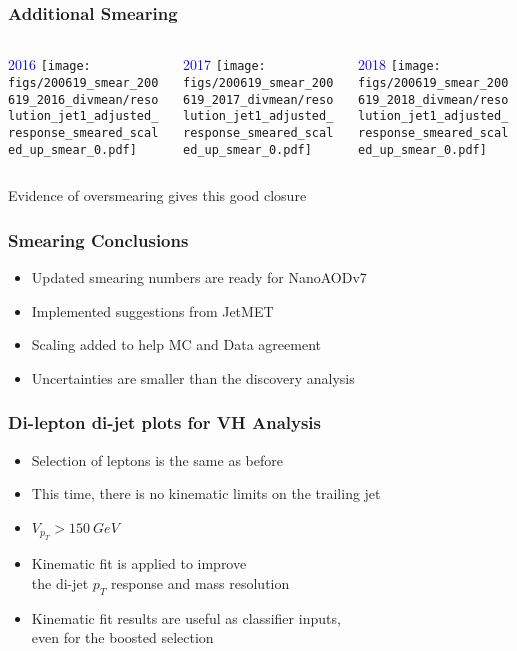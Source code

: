 \documentclass{beamer}
\begin{document}
\begin{frame}
  \frametitle{Additional Smearing}

  \begin{columns}
    \begin{column}{0.33\linewidth}
      \centering
      \textcolor{blue}{2016}
      \texttt{[image: figs/200619\_smear\_200619\_2016\_divmean/resolution\_jet1\_adjusted\_response\_smeared\_scaled\_up\_smear\_0.pdf]}
    \end{column}
    \begin{column}{0.34\linewidth}
      \centering
      \textcolor{blue}{2017}
      \texttt{[image: figs/200619\_smear\_200619\_2017\_divmean/resolution\_jet1\_adjusted\_response\_smeared\_scaled\_up\_smear\_0.pdf]}
    \end{column}
    \begin{column}{0.33\linewidth}
      \centering
      \textcolor{blue}{2018}
      \texttt{[image: figs/200619\_smear\_200619\_2018\_divmean/resolution\_jet1\_adjusted\_response\_smeared\_scaled\_up\_smear\_0.pdf]}
    \end{column}
  \end{columns}

  \vfill
  Evidence of oversmearing gives this good closure

\end{frame}


\begin{frame}
  \frametitle{Smearing Conclusions}

  \begin{itemize}
  \item Updated smearing numbers are ready for NanoAODv7
  \item Implemented suggestions from JetMET
  \item Scaling added to help MC and Data agreement
  \item Uncertainties are smaller than the discovery analysis
  \end{itemize}

\end{frame}


\begin{frame}
  \frametitle{Di-lepton di-jet plots for VH Analysis}

  \begin{itemize}
  \item Selection of leptons is the same as before
  \item This time, there is no kinematic limits on the trailing jet
  \item $V_{p_T} > \SI{150}{GeV}$
  \item Kinematic fit is applied to improve \\
    the di-jet $p_T$ response and mass resolution
  \item Kinematic fit results are useful as classifier inputs, \\
    even for the boosted selection
  \end{itemize}

\end{frame}
\end{document}

